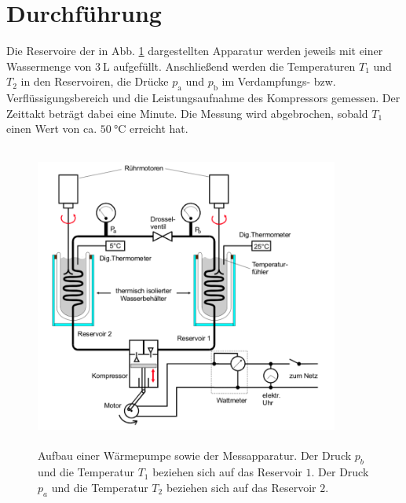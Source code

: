 \section{Durchführung}
\label{sec:Durchführung}

Die Reservoire der in Abb. \ref{fig:aufbau2} dargestellten Apparatur werden jeweils mit einer Wassermenge von 
$\SI{3}{\liter}$ aufgefüllt. Anschließend werden die Temperaturen $T_1$ und $T_\text{2}$ in den 
Reservoiren, die Drücke $p_\text{a}$ und $p_\text{b}$ im Verdampfungs- bzw. Verflüssigungsbereich und 
die Leistungsaufnahme des Kompressors gemessen. Der Zeittakt beträgt dabei eine Minute. 
Die Messung wird abgebrochen, sobald $T_1$ einen Wert von ca. $\SI{50}{\degreeCelsius}$ 
erreicht hat. 
\begin{figure}
    \centering
    \includegraphics[width=10cm, height=10cm]{build/2.png}
    \caption{Aufbau einer Wärmepumpe sowie der Messapparatur.
    Der Druck $p_b$ und die Temperatur
    $T_1$ beziehen sich auf das Reservoir $\num{1}$. Der Druck $p_a$ und die Temperatur
    $T_2$ beziehen sich auf das Reservoir $\num{2}$.}
    \label{fig:aufbau2}
\end{figure}
